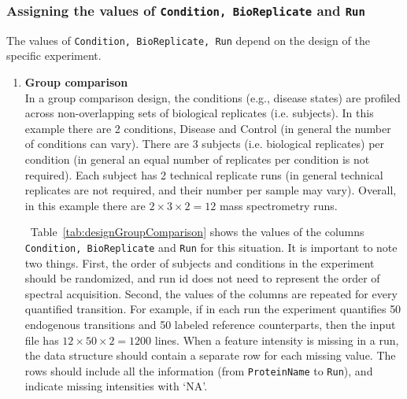 \documentclass[11pt]{article}
\def\tabref#1{Table~\ref{tab:#1}}
\begin{document}

\subsubsection{Assigning the values of {\tt Condition, BioReplicate} and {\tt Run}  \label{sec:SRMassign}}

The values of {\tt Condition, BioReplicate, Run} depend on the design of the specific experiment.

\begin{enumerate}
\item {\bf Group comparison}\\
In a group comparison design, the conditions (e.g., disease states) are profiled across non-overlapping sets of biological replicates (i.e. subjects). In this example there are 2 conditions, Disease and Control (in general the number of conditions can vary). There are 3 subjects (i.e. biological replicates) per condition (in general an equal number of replicates per condition is not required). Each subject has 2 technical replicate runs (in general technical replicates are not required, and their number per sample may vary). Overall, in this example there are $2  \times 3 \times 2 = 12$ mass spectrometry runs.

~\tabref{designGroupComparison} shows the values of the columns {\tt Condition, BioReplicate} and {\tt Run} for this situation. It is important to note two things. First, the order of subjects and conditions in the experiment should be randomized, and run id does not need to represent the order of spectral acquisition. Second, the values of the columns are repeated for every quantified transition. For example, if in each run the experiment quantifies 50 endogenous transitions and 50 labeled reference counterparts, then the input file has $12 \times 50 \times 2 = 1200$ lines. When a feature intensity is missing in a run, the data structure should contain a separate row for each missing value. The rows should include all the information (from {\tt ProteinName} to {\tt Run}), and indicate missing intensities with `NA'.


\end{enumerate}
\end{document}
